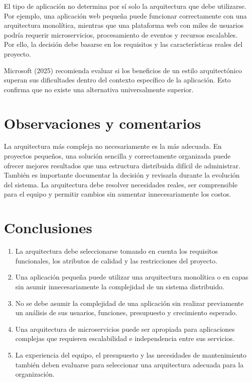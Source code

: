 \documentclass[12pt]{article}
\begin{document}
	El tipo de aplicación no determina por sí solo la arquitectura que debe
	utilizarse. Por ejemplo, una aplicación web pequeña puede funcionar
	correctamente con una arquitectura monolítica, mientras que una plataforma web
	con miles de usuarios podría requerir microservicios, procesamiento de eventos
	y recursos escalables. Por ello, la decisión debe basarse en los requisitos y
	las características reales del proyecto.
	
	Microsoft (2025) recomienda evaluar si los beneficios de un estilo
	arquitectónico superan sus dificultades dentro del contexto específico de la
	aplicación. Esto confirma que no existe una alternativa universalmente
	superior.
		
	\section*{Observaciones y comentarios}
	
	La arquitectura más compleja no necesariamente es la más adecuada. En
	proyectos pequeños, una solución sencilla y correctamente organizada puede
	ofrecer mejores resultados que una estructura distribuida difícil de
	administrar. También es importante documentar la decisión y revisarla durante
	la evolución del sistema. La arquitectura debe resolver necesidades reales,
	ser comprensible para el equipo y permitir cambios sin aumentar
	innecesariamente los costos.
	
	\section*{Conclusiones}
	
	\begin{enumerate}
		
		\item La arquitectura debe seleccionarse tomando en cuenta los requisitos
		funcionales, los atributos de calidad y las restricciones del proyecto.
		
		\item Una aplicación pequeña puede utilizar una arquitectura monolítica o
		en capas sin asumir innecesariamente la complejidad de un sistema
		distribuido.
		
		\item No se debe asumir la complejidad de una aplicación sin realizar
		previamente un análisis de sus usuarios, funciones, presupuesto y
		crecimiento esperado.
		
		\item Una arquitectura de microservicios puede ser apropiada para
		aplicaciones complejas que requieren escalabilidad e independencia entre
		sus servicios.
		
		\item La experiencia del equipo, el presupuesto y las necesidades de
		mantenimiento también deben evaluarse para seleccionar una arquitectura
		adecuada para la organización.
		
		
	\end{enumerate}
	
\end{document}
